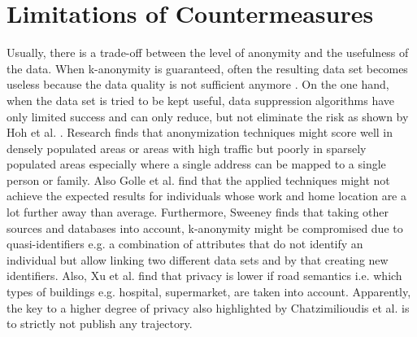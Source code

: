 \section{Limitations of Countermeasures}
Usually, there is a trade-off between the level of anonymity and the usefulness of the data. When k-anonymity is guaranteed, often the resulting data set becomes useless because the data quality is not sufficient anymore \parencite{krumm, cellphone, k-anonymity-old, k-anonymity, k-anonymity-achieving}.
On the one hand, when the data set is tried to be kept useful, data suppression algorithms have only limited success and can only reduce, but not eliminate the risk as shown by Hoh et al. \parencite{hoh2006enhancing}. Research \parencite{time-to-confusion, location-privacy, hoh2006enhancing} finds that anonymization techniques might score well in densely populated areas or areas with high traffic but poorly in sparsely populated areas especially where a single address can be mapped to a single person or family. Also Golle et al. \parencite{privacy-home-work-pairs} find that the applied techniques might not achieve the expected results for individuals whose work and home location are a lot further away than average.
Furthermore, Sweeney \parencite{k-anonymity-achieving} finds that taking other sources and databases into account, k-anonymity might be compromised due to quasi-identifiers e.g. a combination of attributes that do not identify an individual but allow linking two different data sets and by that creating new identifiers. Also, Xu et al. \parencite{xu2018location} find that privacy is lower if road semantics i.e. which types of buildings e.g. hospital, supermarket, are taken into account.
Apparently, the key to a higher degree of privacy also highlighted by Chatzimilioudis et al. \parencite{chatzimilioudis2012crowdsourcing} is to strictly not publish any trajectory.


